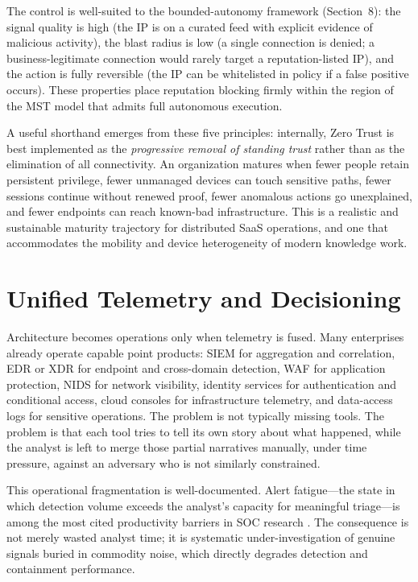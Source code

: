 \documentclass[acmlarge]{acmart}
\begin{document}
The control is well-suited to the bounded-autonomy framework (Section~8): the
signal quality is high (the IP is on a curated feed with explicit evidence of
malicious activity), the blast radius is low (a single connection is denied; a
business-legitimate connection would rarely target a reputation-listed IP), and
the action is fully reversible (the IP can be whitelisted in policy if a false
positive occurs). These properties place reputation blocking firmly within the
region of the MST model that admits full autonomous execution.

A useful shorthand emerges from these five principles: internally, Zero Trust is best
implemented as the \textit{progressive removal of standing trust} rather than as the
elimination of all connectivity. An organization matures when fewer people retain
persistent privilege, fewer unmanaged devices can touch sensitive paths, fewer sessions
continue without renewed proof, fewer anomalous actions go unexplained, and fewer
endpoints can reach known-bad infrastructure. This is a realistic and sustainable
maturity trajectory for distributed SaaS operations, and one that accommodates the
mobility and device heterogeneity of modern knowledge work.

\section{Unified Telemetry and Decisioning}
\label{sec:telemetry}

Architecture becomes operations only when telemetry is fused. Many enterprises already
operate capable point products: SIEM for aggregation and correlation, EDR or XDR for
endpoint and cross-domain detection, WAF for application protection, NIDS for network
visibility, identity services for authentication and conditional access, cloud consoles
for infrastructure telemetry, and data-access logs for sensitive operations. The problem
is not typically missing tools. The problem is that each tool tries to tell its own story
about what happened, while the analyst is left to merge those partial narratives manually,
under time pressure, against an adversary who is not similarly constrained.

This operational fragmentation is well-documented. Alert fatigue---the state in which
detection volume exceeds the analyst's capacity for meaningful triage---is among the
most cited productivity barriers in SOC research \cite{verizon2025}. The consequence is
not merely wasted analyst time; it is systematic under-investigation of genuine signals
buried in commodity noise, which directly degrades detection and containment performance.
\end{document}
